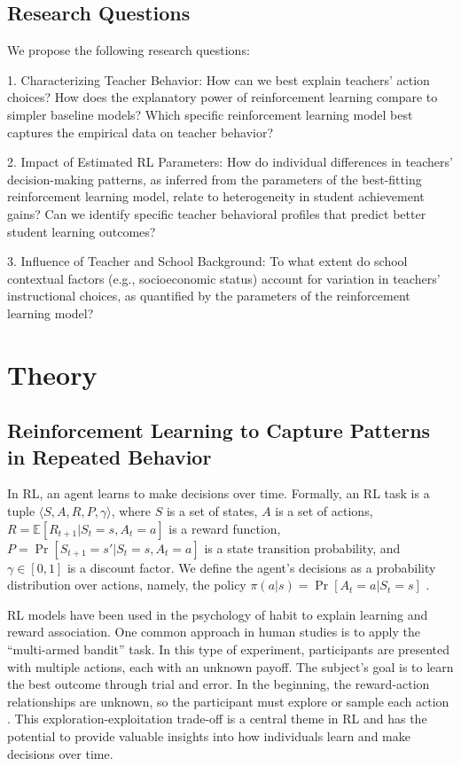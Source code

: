 \documentclass[
  number,
  preprint,
  3p,
  onecolumn]{elsarticle}
\begin{document}
\subsection{Research Questions}\label{research-questions}

We propose the following research questions:

1. Characterizing Teacher Behavior: How can we best explain teachers'
action choices? How does the explanatory power of reinforcement learning
compare to simpler baseline models? Which specific reinforcement
learning model best captures the empirical data on teacher behavior?

2. Impact of Estimated RL Parameters: How do individual differences in
teachers' decision-making patterns, as inferred from the parameters of
the best-fitting reinforcement learning model, relate to heterogeneity
in student achievement gains? Can we identify specific teacher
behavioral profiles that predict better student learning outcomes?

3. Influence of Teacher and School Background: To what extent do school
contextual factors (e.g., socioeconomic status) account for variation in
teachers' instructional choices, as quantified by the parameters of the
reinforcement learning model?

\section{Theory}\label{theory}

\subsection{Reinforcement Learning to Capture Patterns in Repeated
Behavior}\label{reinforcement-learning-to-capture-patterns-in-repeated-behavior}

In RL, an agent learns to make decisions over time. Formally, an RL task
is a tuple \(\langle S,A,R,P,\gamma \rangle\), where \(S\) is a set of
states, \(A\) is a set of actions,
\(R = \mathbb{E}[R_{t+1}|S_t = s, A_t = a]\) is a reward function,
\(P= \Pr[S_{t+1} = s′ |S_t = s,A_t = a]\) is a state transition
probability, and \(\gamma \in [0,1]\) is a discount factor. We define
the agent's decisions as a probability distribution over actions,
namely, the policy \(\pi(a|s) = \Pr[A_t = a|S_t = s]\)
\citep{sutton2018}.

RL models have been used in the psychology of habit to explain learning
and reward association. One common approach in human studies is to apply
the ``multi-armed bandit'' task. In this type of experiment,
participants are presented with multiple actions, each with an unknown
payoff. The subject's goal is to learn the best outcome through trial
and error. In the beginning, the reward-action relationships are
unknown, so the participant must explore or sample each action
\citep{sutton2018} . This exploration-exploitation trade-off is a
central theme in RL and has the potential to provide valuable insights
into how individuals learn and make decisions over time.
\end{document}
